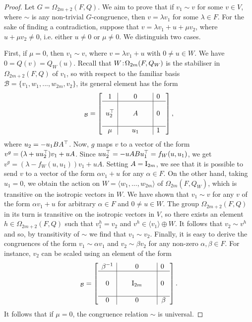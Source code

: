 \begin{proof}
	Let $G = \Omega_{2m+2}(F,Q)$. We aim to prove that if $v_1 \sim v$ for some $v \in V$, where
	$\sim$ is any non-trivial $G$-congruence, then $v = \lambda v_1$ for some $\lambda \in F$. 
	For the sake of finding a contradiction, suppose that $v = \lambda v_1 + u + \mu v_2$,
	where $u + \mu v_2 \neq 0$, i.e. either $u \neq 0$ or $\mu \neq 0$. We distinguish two cases.
	
	First, if $\mu = 0$, then $v_1 \sim v$, where $v = \lambda v_1 + u$ with $0\neq u \in W$.
	We have $0 = Q(v) = Q_W(u)$. 
	Recall that $W\mathord{{\;\!{:}\;\!}} \Omega_{2m}(F,Q_W)$ is the stabiliser in $\Omega_{2m+2}(F, Q)$ of $v_1$,
	so with respect to the familiar basis $\mathcal{B} = \{v_1, w_1 ,..., w_{2m}, v_2\}$,
	its general element has the form 
	\begin{equation*}
	[g]_{\mathcal{B}}=\left[
	    \begin{array}{c|c|c}
		1 & 0 & 0\  \\ \hline 
		 & & \\
		u_2^\T &\ \ \ \ \ A\ \ \ \ \  & 0\  \\ 
		 & & \\ \hline 
		\mu & u_1 & 1\ 
	    \end{array}
	\right],
	\end{equation*}
	where $u_2 = -u_1 BA^{\top}$. Now, $g$ maps $v$ to a vector of the form \mbox{$v^g = 
	(\lambda + u u_2^{\top}) v_1 + uA$}. Since $u u_2^{\top} = 
	-u A B u_1^{\top} = f_W(u, u_1)$, we get \mbox{$v^g = (\lambda - f_W(u, u_1))v_1 + uA$}.
	Setting $A = \mathord{\mathrm{I}}_{2m}$, we see that it is possible to send $v$ to a vector
	of the form $\alpha v_1 + u$ for any $\alpha \in F$. On the other hand, taking $u_1 = 0$,
	we obtain the action on \mbox{$W = \langle w_1, ..., w_{2m} \rangle$} 
	of $\Omega_{2m}(F,Q_W)$, which is 
	transitive on the isotropic vectors in $W$. We have shown that $v_1 \sim v$ for any $v$ of
	the form $\alpha v_1 + u$ for arbitrary $\alpha \in F$ and $0\neq u \in W$. 
	The group $\Omega_{2m+2}(F,Q)$	in 
	its turn is transitive on the isotropic vectors in $V$, so there exists an element
	$h \in \Omega_{2m+2}(F,Q)$ such that $v_1^h = v_2$ and $v^h \in \langle v_1\rangle
	\oplus W$. It follows that $v_2 \sim v^h$ and so, by transitivity of $\sim$ we find that 
	$v_1 \sim v_2$. Finally, it is easy to derive the congruences of the form 
	$v_1 \sim \alpha v_1$ and $v_2 \sim \beta v_2$ for any non-zero $\alpha,\beta \in F$. 
	For instance, $v_2$ can be scaled using an element of the form 
	\begin{equation*}
		[s(\beta)]_{\mathcal{B}} = \left[
	    \begin{array}{c|c|c}
		\beta^{-1} & 0 & 0\  \\ \hline 
		 & & \\
		0 &\ \ \ \ \ \II_{2m}\ \ \ \ \  & 0\  \\ 
		 & & \\ \hline 
		0 & 0 & \beta 
	    \end{array}
	\right].
	\end{equation*}
	It follows that if $\mu = 0$, the congruence relation $\sim$ is universal. 
	
	
\end{proof}


